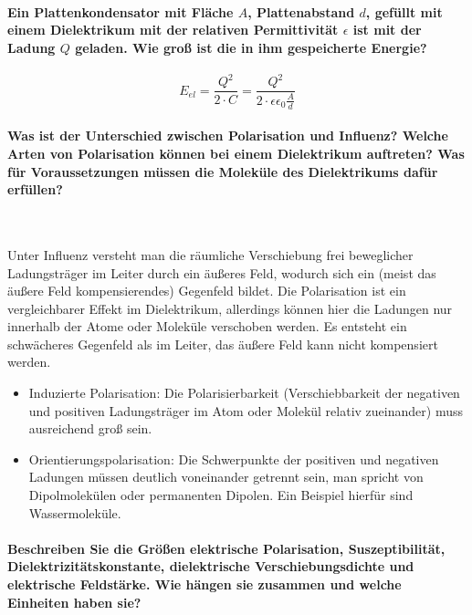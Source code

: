 \documentclass[a4paper, 11pt, ngerman, parskip=half-]{scrartcl}
\begin{document}
\paragraph{Ein Plattenkondensator mit Fläche $A$, Plattenabstand $d$, gefüllt mit einem Dielektrikum
    mit der relativen Permittivität $\epsilon$ ist mit der Ladung $Q$ geladen. Wie groß ist die in ihm
    gespeicherte Energie?}

\begin{equation}
    E_{el} = \frac{Q^2}{2 \cdot C} = \frac{Q^2}{2 \cdot \epsilon \epsilon_0 \frac{A}{d}}
\end{equation}

\paragraph{Was ist der Unterschied zwischen Polarisation und Influenz? Welche Arten von Polarisation
    können bei einem Dielektrikum auftreten? Was für Voraussetzungen müssen die Moleküle des
    Dielektrikums dafür erfüllen?} ~

Unter Influenz versteht man die räumliche Verschiebung frei beweglicher Ladungsträger im Leiter
durch ein äußeres Feld, wodurch sich ein (meist das äußere Feld kompensierendes) Gegenfeld bildet.
Die Polarisation ist ein vergleichbarer Effekt im Dielektrikum, allerdings können hier die Ladungen
nur innerhalb der Atome oder Moleküle verschoben werden. Es entsteht ein schwächeres Gegenfeld als
im Leiter, das äußere Feld kann nicht kompensiert werden.

\begin{itemize}
    \item Induzierte Polarisation: Die Polarisierbarkeit (Verschiebbarkeit der negativen und
          positiven Ladungsträger im Atom oder Molekül relativ zueinander) muss ausreichend groß sein.

    \item Orientierungspolarisation: Die Schwerpunkte der positiven und negativen Ladungen müssen
          deutlich voneinander getrennt sein, man spricht von Dipolmolekülen oder permanenten Dipolen.
          Ein Beispiel hierfür sind Wassermoleküle.
\end{itemize}

\paragraph{Beschreiben Sie die Größen elektrische Polarisation, Suszeptibilität,
    Dielektrizitätskonstante, dielektrische Verschiebungsdichte und elektrische Feldstärke. Wie hängen
    sie zusammen und welche Einheiten haben sie?}
\end{document}
